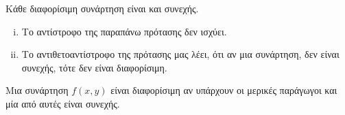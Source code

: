     \begin{prop}
        Κάθε διαφορίσιμη συνάρτηση είναι και συνεχής.
    \end{prop}

    \begin{rem}
    \item {}
        \begin{enumerate}[i)]
            \item Το αντίστροφο της παραπάνω πρότασης δεν ισχύει.
            \item Το αντιθετοαντίστροφο της πρότασης μας λέει, ότι αν μια συνάρτηση, 
                δεν είναι συνεχής, τότε δεν είναι διαφορίσιμη.
        \end{enumerate}
    \end{rem}
        \begin{thm}
            Μια συνάρτηση $ f(x,y) $ είναι διαφορίσιμη αν υπάρχουν οι μερικές παράγωγοι και μία από
            αυτές είναι συνεχής.
        \end{thm}

\newpage

